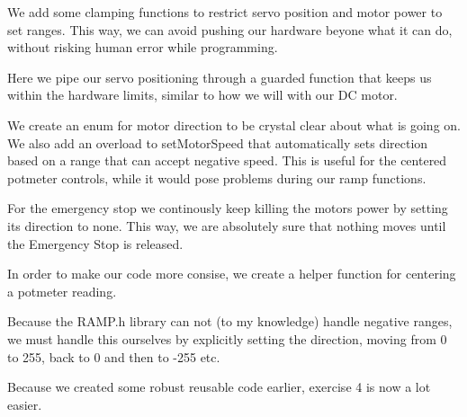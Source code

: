\documentclass[journal]{IEEEtran}
\begin{document}

We add some clamping functions to restrict servo position and motor power to set ranges.
This way, we can avoid pushing our hardware beyone what it can do, without risking
human error while programming.


Here we pipe our servo positioning through a guarded function that keeps us
within the hardware limits, similar to how we will with our DC motor.

\vfill\null
\pagebreak


We create an enum for motor direction to be crystal clear about what is going on. We also add an overload
to setMotorSpeed that automatically sets direction based on a range that can accept negative speed.
This is useful for the centered potmeter controls, while it would pose problems during our ramp functions.

\vfill\null
\pagebreak


For the emergency stop we continously keep killing the motors power by setting its direction to none.
This way, we are absolutely sure that nothing moves until the Emergency Stop is released.




In order to make our code more consise, we create a helper function for centering a potmeter reading.

\vfill\null
\pagebreak


Because the RAMP.h library can not (to my knowledge) handle negative ranges, we must handle this ourselves by explicitly
setting the direction, moving from 0 to 255, back to 0 and then to -255 etc.


Because we created some robust reusable code earlier, exercise 4 is now a lot easier.
\end{document}
